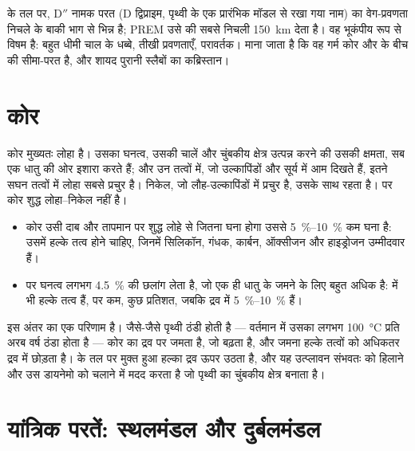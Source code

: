  के तल पर, D$''$ नामक परत (D द्विप्राइम, पृथ्वी के एक प्रारंभिक मॉडल से रखा गया नाम) का वेग-प्रवणता निचले  के बाकी भाग से भिन्न है; PREM उसे  की सबसे निचली \qty{150}{km} देता है। वह भूकंपीय रूप से विषम है: बहुत धीमी चाल के धब्बे, तीखी प्रवणताएँ, परावर्तक। माना जाता है कि वह गर्म कोर और  के बीच की सीमा-परत है, और शायद पुरानी स्लैबों का कब्रिस्तान।

\section{कोर}

कोर मुख्यतः लोहा है। उसका घनत्व, उसकी चालें और चुंबकीय क्षेत्र उत्पन्न करने की उसकी क्षमता, सब एक धातु की ओर इशारा करते हैं; और उन तत्वों में, जो उल्कापिंडों और सूर्य में आम दिखते हैं, इतने सघन तत्वों में लोहा सबसे प्रचुर है। निकेल, जो लौह-उल्कापिंडों में प्रचुर है, उसके साथ रहता है। पर कोर शुद्ध लोहा–निकेल नहीं है।
\begin{itemize}
  \item कोर उसी दाब और तापमान पर शुद्ध लोहे से जितना घना होगा उससे \qtyrange{5}{10}{\percent} कम घना है: उसमें हल्के तत्व होने चाहिए, जिनमें सिलिकॉन, गंधक, कार्बन, ऑक्सीजन और हाइड्रोजन उम्मीदवार हैं।
  \item {} पर घनत्व लगभग \qty{4.5}{\percent} की छलांग लेता है, जो एक ही धातु के जमने के लिए बहुत अधिक है:  में भी हल्के तत्व हैं, पर कम, कुछ प्रतिशत, जबकि द्रव में \qtyrange{5}{10}{\percent} हैं।
\end{itemize}
इस अंतर का एक परिणाम है। जैसे-जैसे पृथ्वी ठंडी होती है --- वर्तमान में उसका  लगभग \qty{100}{\degreeCelsius} प्रति अरब वर्ष ठंडा होता है --- कोर का द्रव  पर जमता है, जो बढ़ता है, और
जमना हल्के तत्वों को अधिकतर द्रव में छोड़ता है।  के तल पर मुक्त हुआ हल्का द्रव ऊपर उठता है, और यह उत्प्लावन संभवतः  को हिलाने और उस डायनेमो को चलाने में मदद करता है जो पृथ्वी का चुंबकीय क्षेत्र बनाता है।

\section{यांत्रिक परतें: स्थलमंडल और दुर्बलमंडल}

